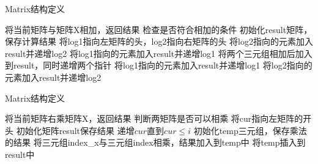 \begin{algorithm}[htb] 
   \caption{ Matrix结构定义 } 
   \label{alg:Framwork} 
   \begin{algorithmic}[1]
      \State 将当前矩阵与矩阵X相加，返回结果
         \State 检查是否符合相加的条件
         \State 初始化result矩阵，保存计算结果
         \State 将log1指向左矩阵的头，log2指向右矩阵的头
               \State 将log2指向的元素加入result并递增log2
            \EndIf
               \State 将log1指向的元素加入result并递增log1
            \EndIf
               \State 将两个三元组相加后加入到result，同时递增两个指针
            \EndIf
               \State 将log1指向的元素加入result并递增log1
            \Else
               \State 将log2指向的元素加入result并递增log2
            \EndIf
         \EndWhile
      \EndFunction

   \end{algorithmic} 
\end{algorithm}

\newpage

\begin{algorithm}[htb] 
   \caption{ Matrix结构定义 } 
   \label{alg:Framwork} 
   \begin{algorithmic}[1]
      \State 将当前矩阵右乘矩阵X，返回结果
         \State 判断两矩阵是否可以相乘
         \State 将cur指向左矩阵的开头
         \State 初始化矩阵result保存结果
            \State 递增$cur$直到$cur \leq i$
               \State 初始化temp三元组，保存乘法的结果
                        \State 将三元组index\_x与三元组index相乘，结果加入到temp中
                     \EndIf
                  \EndFor
               \EndFor
                  \State 将temp插入到result中
               \EndIf
            \EndFor
         \EndFor
               
      \EndFunction

   \end{algorithmic} 
\end{algorithm}

